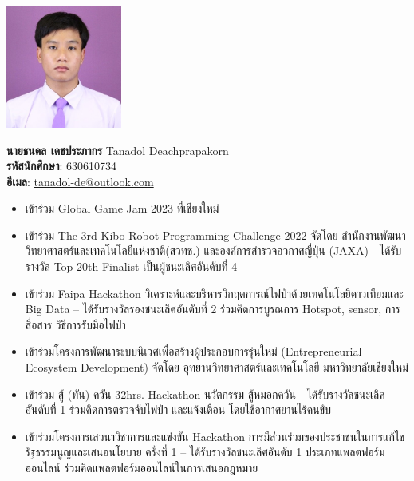 \documentclass[semifinal]{cpecmu}
\author{นายธนดล เดชประภากร}{Tanadol Deachprapakorn}{630610734}
\author{นายภูริช สีนวลแล}{Purich Seenaullae}{630610752}
\begin{document}


\pagestyle{empty}\cleardoublepage
\normalspacing \setcounter{page}{1}  \pagestyle{cpecmu}





\ifproject

\fi




\ifproject
\normalspacing
\appendix


\ifglossary\glossarypage\fi

\ifindex\indexpage\fi

\begin{biosketch}
  \begin{center}
    \includegraphics[width=1.5in]{./img/phu.png}
  \end{center}
  \textbf{นายธนดล เดชประภากร} Tanadol Deachprapakorn \\
  \textbf{รหัสนักศึกษา}: 630610734 \\
  \textbf{อีเมล}: \href{mailto:tanadol-de@outlook.com}{tanadol-de@outlook.com}
  \begin{itemize}
    \item เข้าร่วม Global Game Jam 2023 ที่เชียงใหม่
    \item เข้าร่วม The 3rd Kibo Robot Programming Challenge 2022 จัดโดย สำนักงานพัฒนาวิทยาศาสตร์และเทคโนโลยีแห่งชาติ(สวทช.) และองค์การสำรวจอวกาศญี่ปุ่น (JAXA) - ได้รับรางวัล Top 20th Finalist เป็นผู้ชนะเลิศอันดับที่ 4
    \item	เข้าร่วม Faipa Hackathon วิเคราะห์และบริหารวิกฤตการณ์ไฟป่าด้วยเทคโนโลยีดาวเทียมและ Big Data – ได้รับรางวัลรองชนะเลิศอันดับที่ 2 ร่วมคิดการบูรณการ Hotspot, sensor, การสื่อสาร วิธีการรับมือไฟป่า
    \item	เข้าร่วมโครงการพัฒนาระบบนิเวศเพื่อสร้างผู้ประกอบการรุ่นใหม่ (Entrepreneurial Ecosystem Development) จัดโดย อุทยานวิทยาศาสตร์และเทคโนโลยี มหาวิทยาลัยเชียงใหม่
    \item เข้าร่วม สู้ (ทัน) ควัน 32hrs. Hackathon นวัตกรรม สู้หมอกควัน - ได้รับรางวัลชนะเลิศอันดับที่ 1 ร่วมคิดการตรวจจับไฟป่า และแจ้งเตือน โดยใช้อากาศยานไร้คนขับ
    \item เข้าร่วมโครงการเสวนาวิชาการและแข่งขัน Hackathon การมีส่วนร่วมของประชาชนในการแก้ไขรัฐธรรมนูญและเสนอนโยบาย ครั้งที่ 1 – ได้รับรางวัลชนะเลิศอันดับ 1 ประเภทแพลตฟอร์มออนไลน์ ร่วมคิดแพลตฟอร์มออนไลน์ในการเสนอกฎหมาย
  \end{itemize}
\end{biosketch}
\end{document}
